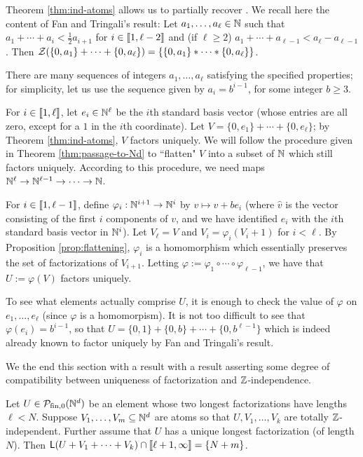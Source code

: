 \begin{eg} \label{eg:recover-flat-unique-fac}
Theorem \ref{thm:ind-atoms} allows us to partially recover \cite[Proposition 4.9]{fan-tringali18}.
We recall here the content of Fan and Tringali's result: Let $a_1,\dots, a_\ell \in \mathbb{N}$ such that $a_1 + \cdots + a_i < \frac{1}{2} a_{i+1}$ for $i\in \llbracket 1,\ell-2 \rrbracket$ and (if $\ell \ge 2$) $a_1+\cdots + a_{\ell-1} < a_\ell - a_{\ell-1}$.
Then $\mathcal{Z}(\{0,a_1\}+\cdots+\{0,a_\ell\}) = \{ \{0,a_1\}*\cdots*\{0,a_\ell\}\}$.

There are many sequences of integers $a_1,\dots,a_\ell$ satisfying the specified properties; for simplicity, let us use the sequence given by $a_i = b^{i-1}$, for some integer $b \ge 3$.

For $i\in \llbracket 1,\ell \rrbracket$, let $e_i \in \mathbb{N}^\ell$ be the $i$th standard basis vector (whose entries are all zero, except for a $1$ in the $i$th coordinate).
Let $V = \{0,e_1\} + \cdots + \{0,e_\ell\}$; by Theorem \ref{thm:ind-atoms}, $V$ factors uniquely.
We will follow the procedure given in Theorem \ref{thm:passage-to-Nd} to ``flatten" $V$ into a subset of $\mathbb{N}$ which still factors uniquely.
According to this procedure, we need maps $\mathbb{N}^\ell \to \mathbb{N}^{\ell-1} \to \dots \to \mathbb{N}$.

For $i\in \llbracket 1,\ell-1 \rrbracket$, define $\varphi_i: \mathbb{N}^{i+1} \to \mathbb{N}^{i}$ by $v \mapsto \hat{v} + be_{i}$ (where $\hat{v}$ is the vector consisting of the first $i$ components of $v$, and we have identified $e_i$ with the $i$th standard basis vector in $\mathbb{N}^i$).
Let $V_\ell = V$ and $V_i = \varphi_i(V_i+1)$ for $i <\ell$.
By Proposition \ref{prop:flattening}, $\varphi_i$ is a homomorphism which essentially preserves the set of factorizations of $V_{i+1}$.
Letting $\varphi := \varphi_1\circ \cdots \circ \varphi_{\ell-1}$, we have that $U := \varphi(V)$ factors uniquely.

To see what elements actually comprise $U$, it is enough to check the value of $\varphi$ on $e_1,\dots, e_\ell$ (since $\varphi$ is a homomorpism).
It is not too difficult to see that $\varphi(e_i) = b^{i-1}$, so that $U = \{0,1\}+\{0,b\}+\cdots+\{0,b^{\ell-1}\}$ which is indeed already known to factor uniquely by Fan and Tringali's result.
\end{eg}

We the end this section with a result with a result asserting some degree of compatibility between uniqueness of factorization and $\mathbb{Z}$-independence.

\begin{thm} \label{thm:unique longest factorization}
Let $U\in \mathcal{P}_{\textrm{fin}, 0}(\mathbb{N}^d)$ be an element whose two longest factorizations have lengths $\ell < N$.
Suppose $V_1,\dots,V_m\subseteq \mathbb{N}^d$ are atoms so that $U,V_1,\dots, V_k$ are totally $\mathbb{Z}$-independent.
Further assume that $U$ has a unique longest factorization (of length $N$).
Then $\mathsf{L}(U+V_1+\cdots+V_k) \cap \llbracket \ell+1,\infty \rrbracket = \{N+m\}$.
\end{thm}

